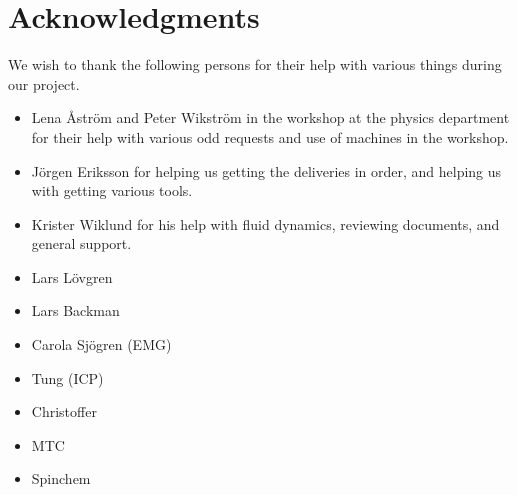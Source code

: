\section*{Acknowledgments}
We wish to thank the following persons for their help with various things during our project.
\begin{itemize}
\item Lena Åström and Peter Wikström in the workshop at the physics department for their help with various odd requests and use of machines in the workshop.

\item   Jörgen Eriksson for helping us getting the deliveries in order, and helping us with getting various tools.

\item   Krister Wiklund for his help with fluid dynamics, reviewing documents, and general support.

\item   Lars Lövgren

\item   Lars Backman

\item   Carola Sjögren (EMG)

\item   Tung (ICP)

\item   Christoffer

\item   MTC

\item   Spinchem
\end{itemize}

